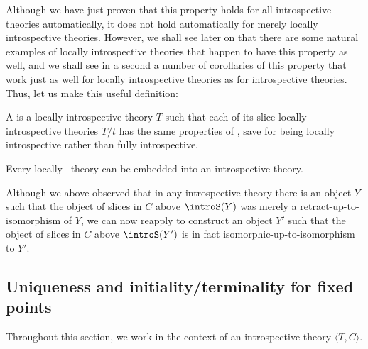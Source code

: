 Although we have just proven that this property holds for all introspective theories automatically, it does not hold automatically for merely locally introspective theories. However, we shall see later on that there are some natural examples of locally introspective theories that happen to have this property as well, and we shall see in a second a number of corollaries of this property that work just as well for locally introspective theories as for introspective theories. Thus, let us make this useful definition:

\begin{definition}
A  is a locally introspective theory $T$ such that each of its slice locally introspective theories $T/t$ has the same properties of , save for being locally introspective rather than fully introspective.
\end{definition}

\begin{conjecture}
Every locally \Loeb\ theory can be embedded into an introspective theory.
\end{conjecture}

\begin{observation}
Although we above observed that in any introspective theory there is an object $Y$ such that the object of slices in $C$ above $\introS(Y)$ was merely a retract-up-to-isomorphism of $Y$, we can now reapply  to construct an object $Y'$ such that the object of slices in $C$ above $\introS(Y')$ is in fact isomorphic-up-to-isomorphism to $Y'$. 
\end{observation}

\subsection{Uniqueness and initiality/terminality for fixed points}
Throughout this section, we work in the context of an introspective theory $\langle T, C \rangle$. 

